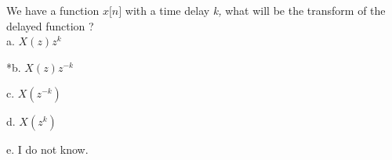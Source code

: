 
We have a function \(x\lbrack n\rbrack\) with a time delay \emph{k,}
what will be the transform of the delayed function ? \\

a. \(X(z)z^{k}\)

*b. \(X(z)z^{- k}\)

c. \(X(z^{- k})\)

d. \(X(z^{k})\)

e. I do not know. \\
